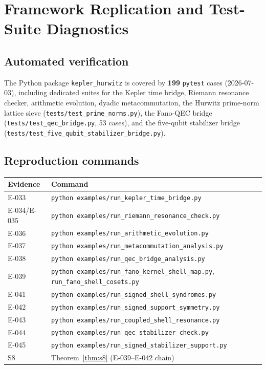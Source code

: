 \documentclass[11pt, lettersize, article]{article}
\theoremstyle{definition}
\theoremstyle{remark}
\begin{document}
\section{Framework Replication and Test-Suite Diagnostics}
\label{sec:replication}

\subsection{Automated verification}

The Python package \texttt{kepler\_hurwitz} is covered by \textbf{199} \texttt{pytest} cases (2026-07-03), including dedicated suites for the Kepler time bridge, Riemann resonance checker, arithmetic evolution, dyadic metacommutation, the Hurwitz prime-norm lattice sieve (\texttt{tests/test\_prime\_norms.py}), the Fano-QEC bridge (\texttt{tests/test\_qec\_bridge.py}, 53 cases), and the five-qubit stabilizer bridge (\texttt{tests/test\_five\_qubit\_stabilizer\_bridge.py}).

\subsection{Reproduction commands}

\begin{center}
\begin{tabular}{l l}
\toprule
Evidence & Command \\
\midrule
E-033 & \texttt{python examples/run\_kepler\_time\_bridge.py} \\
E-034/E-035 & \texttt{python examples/run\_riemann\_resonance\_check.py} \\
E-036 & \texttt{python examples/run\_arithmetic\_evolution.py} \\
E-037 & \texttt{python examples/run\_metacommutation\_analysis.py} \\
E-038 & \texttt{python examples/run\_qec\_bridge\_analysis.py} \\
E-039 & \texttt{python examples/run\_fano\_kernel\_shell\_map.py}, \texttt{run\_fano\_shell\_cosets.py} \\
E-041 & \texttt{python examples/run\_signed\_shell\_syndromes.py} \\
E-042 & \texttt{python examples/run\_signed\_support\_symmetry.py} \\
E-043 & \texttt{python examples/run\_coupled\_shell\_resonance.py} \\
E-044 & \texttt{python examples/run\_qec\_stabilizer\_check.py} \\
E-045 & \texttt{python examples/run\_signed\_stabilizer\_support.py} \\
S8 & Theorem~\ref{thm:s8} (E-039--E-042 chain) \\
\bottomrule
\end{tabular}
\end{center}
\end{document}
